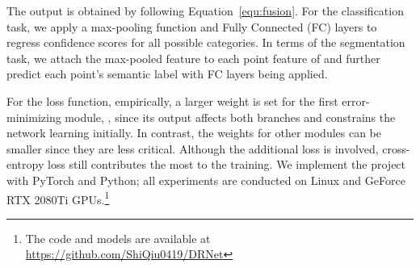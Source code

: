 \documentclass[10pt,twocolumn,letterpaper]{article}
\begin{document}
The output  is obtained by following Equation~\ref{equ:fusion}. For the classification task, we apply a max-pooling function and Fully Connected (FC) layers to regress confidence scores for all possible categories. In terms of the segmentation task, we attach the max-pooled feature to each point feature of  and further predict each point's semantic label with FC layers being applied. 

For the loss function, empirically, a larger weight is set for the first error-minimizing module, \ie , since its output affects both branches and constrains the network learning initially. In contrast, the weights for other modules can be smaller since they are less critical. Although the additional loss is involved, cross-entropy loss still contributes the most to the training. We implement the project with PyTorch and Python; all experiments are conducted on Linux and GeForce RTX 2080Ti GPUs.\footnote{The code and models are available at \url{https://github.com/ShiQiu0419/DRNet}}
\end{document}
